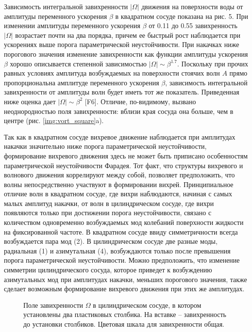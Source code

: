 Зависимость интегральной завихренности $|\Omega|$ движения на поверхности воды от амплитуды переменного ускорения $\beta$ в квадратном сосуде показана на рис. 5. При изменении амплитуды переменного ускорения $\beta$ от 0.11 до 0.55 завихренность $|\Omega|$ возрастает почти на два порядка, причем ее быстрый рост наблюдается при ускорениях выше порога параметрической неустойчивости. При накачках ниже порогового значения изменение завихренности как функции амплитуды ускорения $\beta$ хорошо описывается степенной зависимостью $|\Omega| \sim \beta^{1.7}$. Поскольку при прочих равных условиях амплитуда возбуждаемых на поверхности стоячих волн $A$ прямо пропорциональна амплитуде переменного ускорения $\beta$, зависимость интегральной завихренности от амплитуды волн будет иметь тот же показатель. Приведенная ниже оценка дает $|\Omega| \sim \beta^{2}$ [F6]. Отличие, по-видимому, вызвано неоднородностью поля завихренности: вблизи края сосуда она больше, чем в центре (рис. \ref{img:vort_square}a).

Так как в квадратном сосуде вихревое движение наблюдается при амплитудах накачки значительно ниже порога параметрической неустойчивости, формирование вихревого движения здесь не может быть приписано особенностям параметрической неустойчивости Фарадея. Тот факт, что структуры вихревого и волнового движения коррелируют между собой, позволяет предположить, что волны непосредственно участвуют в формировании вихрей. Принципиальное отличие волн в квадратном сосуде, где вихри наблюдаются, начиная с самых малых амплитуд накачки, от волн в цилиндрическом сосуде, где вихри появляются только при достижении порога неустойчивости, связано с количеством одновременно возбуждаемых мод колебаний поверхности жидкости на фиксированной частоте. В квадратном сосуде ввиду симметричности всегда возбуждается пара мод (2). В цилиндрическом сосуде две разные моды, радиальная (1) и азимутальная (4), возбуждаются только после превышения порога параметрической неустойчивости. Можно предположить, что изменение симметрии цилиндрического сосуда, которое приведет к возбуждению азимутальных мод при амплитудах накачки, меньших порогового значения, также сделает возможным формирование вихревого движения при этих же амплитудах.

\begin{figure}[ht]
  \begin{minipage}[ht]{0.49\linewidth}
  \end{minipage}
  \hfill
  \begin{minipage}[ht]{0.49\linewidth}
  \end{minipage}
  \caption{Поле завихренности $\Omega$ в цилиндрическом сосуде, в котором установлены два пластиковых столбика. На вставке – завихренность до установки столбиков. Цветовая шкала для завихренности общая.}
  \label{img:vort_st}  
\end{figure}

